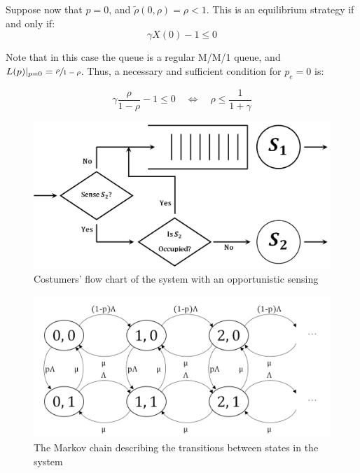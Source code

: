 \documentclass[11pt]{article}
\numberwithin{equation}{section}
\begin{document}
Suppose now that $p=0$, and $\tilde{\rho}(0,\rho) = \rho < 1$. This is an equilibrium strategy if and only if:
\[ \gamma X(0)-1 \leq 0 \]

Note that in this case the queue is a regular M/M/1 queue, and $L(p)|_{p=0} = \sfrac{\rho}{1-\rho}$. Thus, a necessary and sufficient condition for $p_{e}=0$ is:

\[ \gamma \frac{\rho}{1-\rho}-1 \leq 0 \quad\Leftrightarrow\quad \rho \leq \frac{1}{1+\gamma} \]

\newpage
\begin{figure}[h!]
    \centering
    \includegraphics[width=1\textwidth]{Fig_1.png}
    \caption{Costumers' flow chart of the system with an opportunistic sensing}
    \label{CostumersFlow}
\end{figure}

\begin{figure}[h!]
  \centering
    \includegraphics[width=1\textwidth]{Fig_2.png}
    \caption{The Markov chain describing the transitions between states in the system}
    \label{MarkovChain}
\end{figure}
\end{document}

